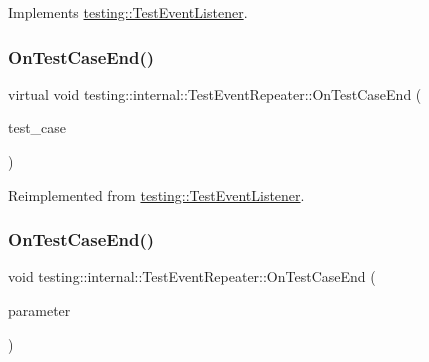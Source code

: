 Implements \mbox{\hyperlink{classtesting_1_1_test_event_listener_a468b5e6701bcb86cb2c956caadbba5e4}{testing\+::\+Test\+Event\+Listener}}.

\mbox{\label{classtesting_1_1internal_1_1_test_event_repeater_a0a335e1c3957a8c699ed56e37ea7b978}} 
\subsubsection{\texorpdfstring{OnTestCaseEnd()}{OnTestCaseEnd()}\hspace{0.1cm}{\footnotesize\ttfamily [1/3]}}
{\footnotesize\ttfamily virtual void testing\+::internal\+::\+Test\+Event\+Repeater\+::\+On\+Test\+Case\+End (\begin{DoxyParamCaption}\item[{const \mbox{\hyperlink{classtesting_1_1_test_case}{Test\+Case}} \&}]{test\+\_\+case }\end{DoxyParamCaption})\hspace{0.3cm}{\ttfamily [virtual]}}



Reimplemented from \mbox{\hyperlink{classtesting_1_1_test_event_listener_a6cada1572dde8010b94f6dd237ce52f4}{testing\+::\+Test\+Event\+Listener}}.

\mbox{\label{classtesting_1_1internal_1_1_test_event_repeater_a78ea68cab4207e0fd458ced444f42ef5}} 
\subsubsection{\texorpdfstring{OnTestCaseEnd()}{OnTestCaseEnd()}\hspace{0.1cm}{\footnotesize\ttfamily [2/3]}}
{\footnotesize\ttfamily void testing\+::internal\+::\+Test\+Event\+Repeater\+::\+On\+Test\+Case\+End (\begin{DoxyParamCaption}\item[{const \mbox{\hyperlink{classtesting_1_1_test_suite}{Test\+Suite}} \&}]{parameter }\end{DoxyParamCaption})\hspace{0.3cm}{\ttfamily [override]}}

